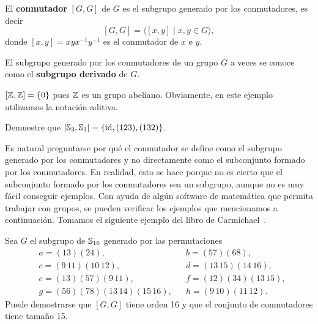 \begin{definition}
El \textbf{conmutador}
$[G,G]$ de $G$ es el subgrupo generado por los conmutadores, es
decir 
\[
[G,G]=\langle[x,y]\mid x,y\in G\rangle,
\]	
donde $[x,y]=xyx^{-1}y^{-1}$ es el conmutador de $x$ e $y$. 
\end{definition}

El subgrupo generado por los conmutadores de un grupo $G$ a veces se conoce como el \textbf{subgrupo derivado} de $G$. 

\begin{example}
	$[\mathbb{Z},\mathbb{Z}]=\{0\}$ pues $\mathbb{Z}$ es un grupo abeliano. Obviamente, en este ejemplo
	utilizamos la notación aditiva. 
\end{example}

\begin{exercise}
	Demuestre que $[\mathbb{S}_3,\mathbb{S}_3]=\{\operatorname{id},(123),(132)\}$. 
\end{exercise}


Es natural preguntarse por qué el conmutador se define como el subgrupo
generado por los conmutadores y no directamente como el subconjunto formado por los conmutadores. En realidad, esto se hace porque no es cierto que el subconjunto formado por los conmutadores sea un subgrupo, aunque no es muy fácil conseguir ejemplos. Con ayuda de algún software de matemática que permita trabajar con grupos, se pueden verificar
los ejemplos que mencionamos a continuación. Tomamos el siguiente ejemplo del libro de Carmichael~\cite{MR0075938}.
	
\begin{example}
	Sea $G$ el subgrupo de $\mathbb{S}_{16}$ generado por 
	las permutaciones
	\begin{align*}
&a = (13)(24),&&
b = (57)(68),\\
&c = (9\,11)(10\,12),&&
d = (13\,15)(14\,16),\\
&e = (13)(57)(9\,11),&&
f = (12)(34)(13\,15),\\
&g = (56)(78)(13\,14)(15\,16),&&
h = (9\,10)(11\,12).
\end{align*}	
	Puede demostrarse que $[G,G]$ tiene orden 16 y que el conjunto de conmutadores tiene tamaño 15. 
\end{example}

